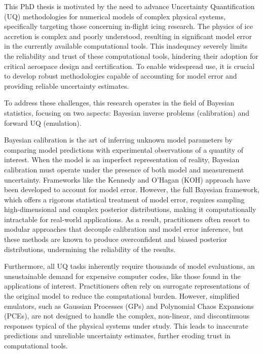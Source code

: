 %
\label{sec:abstract}

This PhD thesis is motivated by the need to advance Uncertainty Quantification (UQ) methodologies for numerical models of complex physical systems, specifically targeting those concerning in-flight icing research. The physics of ice accretion is complex and poorly understood, resulting in significant model error in the currently available computational tools. This inadequacy severely limits the reliability and trust of these computational tools, hindering their adoption for critical aerospace design and certification. To enable widespread use, it is crucial to develop robust methodologies capable of accounting for model error and providing reliable uncertainty estimates. 

\smallskip
To address these challenges, this research operates in the field of Bayesian statistics, focusing on two aspects: Bayesian inverse problems (calibration) and forward UQ (emulation). 

\smallskip
Bayesian calibration is the art of inferring unknown model parameters by comparing model predictions with experimental observations of a quantity of interest. When the model is an imperfect representation of reality, Bayesian calibration must operate under the presence of both model and measurement uncertainty. Frameworks like the Kennedy and O'Hagan (KOH) approach have been developed to account for model error. However, the full Bayesian framework, which offers a rigorous statistical treatment of model error, requires sampling high-dimensional and complex posterior distributions, making it computationally intractable for real-world applications. As a result, practitioners often resort to modular approaches that decouple calibration and model error inference, but these methods are known to produce overconfident and biased posterior distributions, undermining the reliability of the results.

\smallskip
Furthermore, all UQ tasks inherently require thousands of model evaluations, an unsustainable demand for expensive computer codes, like those found in the applications of interest. Practitioners often rely on surrogate representations of the original model to reduce the computational burden. However, simplified emulators, such as Gaussian Processes (GPs) and Polynomial Chaos Expansions (PCEs), are not designed to handle the complex, non-linear, and discontinuous responses typical of the physical systems under study. This leads to inaccurate predictions and unreliable uncertainty estimates, further eroding trust in computational tools.


